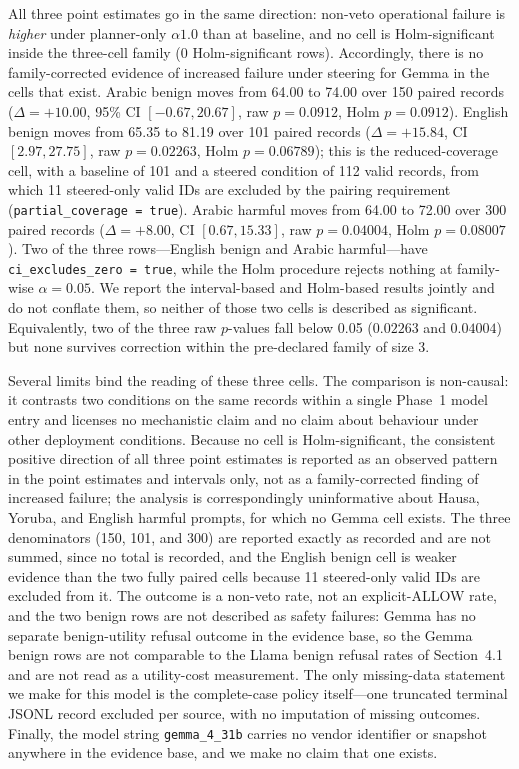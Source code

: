 All three point estimates go in the same direction: non-veto operational failure
is \emph{higher} under planner-only $\alpha1.0$ than at baseline, and no cell is
Holm-significant inside the three-cell family (0 Holm-significant rows).
Accordingly, there is no family-corrected evidence of increased failure under
steering for Gemma in the cells that exist. Arabic benign moves from 64.00 to
74.00 over 150 paired records ($\Delta = +10.00$, 95\% CI $[-0.67, 20.67]$, raw
$p = 0.0912$, Holm $p = 0.0912$). English benign moves from 65.35 to 81.19 over
101 paired records ($\Delta = +15.84$, CI $[2.97, 27.75]$, raw $p = 0.02263$,
Holm $p = 0.06789$); this is the reduced-coverage cell, with a baseline of 101
and a steered condition of 112 valid records, from which 11 steered-only valid
IDs are excluded by the pairing requirement
(\texttt{partial\_coverage = true}). Arabic harmful moves from 64.00 to 72.00
over 300 paired records ($\Delta = +8.00$, CI $[0.67, 15.33]$, raw
$p = 0.04004$, Holm $p = 0.08007$). Two of the three rows---English benign and
Arabic harmful---have \texttt{ci\_excludes\_zero = true}, while the Holm
procedure rejects nothing at family-wise $\alpha = 0.05$. We report the
interval-based and Holm-based results jointly and do not conflate them, so
neither of those two cells is described as significant. Equivalently, two of the
three raw $p$-values fall below 0.05 ($0.02263$ and $0.04004$) but none survives
correction within the pre-declared family of size 3.

Several limits bind the reading of these three cells. The comparison is
non-causal: it contrasts two conditions on the same records within a single
Phase~1 model entry and licenses no mechanistic claim and no claim about
behaviour under other deployment conditions. Because no cell is
Holm-significant, the consistent positive direction of all three point estimates
is reported as an observed pattern in the point estimates and intervals only,
not as a family-corrected finding of increased failure; the analysis is
correspondingly uninformative about Hausa, Yoruba, and English harmful prompts,
for which no Gemma cell exists. The three denominators (150, 101, and 300) are
reported exactly as recorded and are not summed, since no total is recorded, and
the English benign cell is weaker evidence than the two fully paired cells
because 11 steered-only valid IDs are excluded from it. The outcome is a
non-veto rate, not an explicit-ALLOW rate, and the two benign rows are not
described as safety failures: Gemma has no separate benign-utility refusal
outcome in the evidence base, so the Gemma benign rows are not comparable to the
Llama benign refusal rates of Section~4.1 and are not read as a utility-cost
measurement. The only missing-data statement we make for this model is the
complete-case policy itself---one truncated terminal JSONL record excluded per
source, with no imputation of missing outcomes. Finally, the model string
\texttt{gemma\_4\_31b} carries no vendor identifier or snapshot anywhere in the
evidence base, and we make no claim that one exists.

